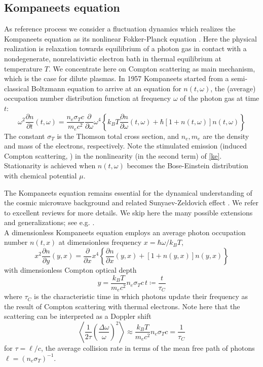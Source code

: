 \documentclass[a4paper,12pt,reqno,superscriptaddress,nofootinbib]{article}
\theoremstyle{plain}
\theoremstyle{definition}
\theoremstyle{remark}
\newcommand{\0}{^{(0)}}
\newcommand{\1}{^{(1)}}
\newcommand{\2}{^{(2)}}
\begin{document}
\subsection{Kompaneets equation}
As reference process we consider a fluctuation dynamics which realizes the Kompaneets equation as its nonlinear Fokker-Planck equation \cite{paper2}.  Here the physical realization is relaxation towards equilibrium of a photon gas in contact with a nondegenerate, nonrelativistic electron bath in thermal equilibrium at temperature $T$.  We concentrate here on Compton scattering as main mechanism, which is the case for dilute plasmas. In 1957 Kompaneets \cite{kompa} started from a semi-classical Boltzmann equation to arrive at an equation for $n(t,\omega)$, the (average) occupation number distribution function at frequency $\omega$ of the photon gas at time $t$:
\begin{equation}\label{ke}
\omega^2\frac{\partial n}{\partial t}(t,\omega)= \frac{n_e\sigma_T 
	c}{m_e c^2}\frac{\partial }{\partial \omega}\omega^4\left\{k_B T 
\frac{\partial n}{\partial \omega}(t,\omega) + 
\hbar\left[1+n(t,\omega)\right]n(t,\omega)\right\}
\end{equation}
The constant $\sigma_T$ is the Thomson total cross section, and $n_e,m_e$ are  the density and mass of the electrons, respectively.
Note the stimulated emission (induced Compton scattering, \cite{liedahl, blandford}) in the  nonlinearity (in the second term) of \eqref{ke}. Stationarity is achieved when $n(t,\omega)$ becomes the Bose-Einstein distribution with chemical potential $\mu$.

The Kompaneets equation remains essential for the dynamical understanding of the cosmic microwave background and related Sunyaev-Zeldovich effect \cite{sunyaeveffect,sunyaev}. We refer to excellent reviews \cite{practical,gui,zeldovich} for more details. We skip here the many possible extensions and generalizations; see e.g. \cite{buet, pitrou,barbosa, brown, itoh, itoh2, cooper, kohyama1, kohyama2, kohyama3,paper}.\\

A dimensionless Kompaneets equation employs an average photon occupation number $n(t, x)$ at dimensionless frequency $x= \hbar \omega/k_B T$,
\begin{equation}\label{ake}
x^2\frac{\partial n}{\partial y}(y,x) = \frac{\partial }{\partial x}x^4\left\{
\frac{\partial n}{\partial x}(y,x) + 
\left[1+n(y,x)\right]n(y,x)\right\}
\end{equation}
with dimensionless Compton optical depth
\[y = \frac{ k_B T }{m_e c^2} n_e \sigma_T c \, t\coloneqq \frac{ t}{\tau_C}\]
where $\tau_C$ is  the  characteristic time in which photons update their frequency as the result of Compton scattering with thermal electrons.  Note here that the scattering can be interpreted as a Doppler shift
\begin{equation}\label{shift}
\left\langle\frac{1}{2\tau}\left(\frac{\Delta\omega}{\omega}\right)^2\right\rangle\approx \frac{ k_B T }{m_e c^2} n_e \sigma_T c= \frac{1}{\tau_C}
\end{equation} 
for $\tau = \ell/c$, the average collision rate in terms of the mean free path of photons $\ell=(n_e\sigma_T)^{-1}$.\\
\end{document}
